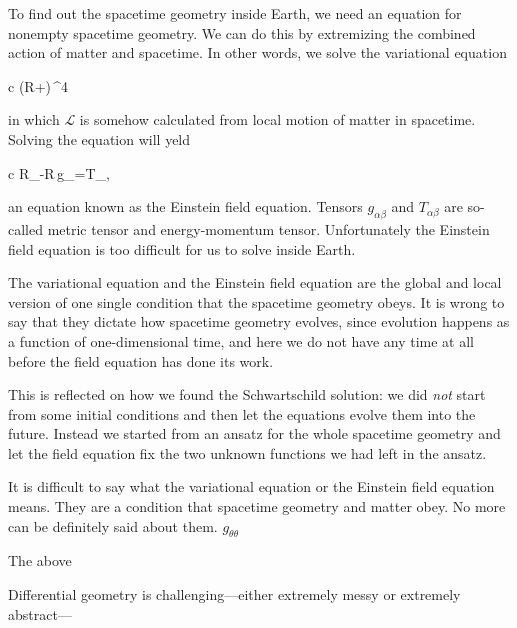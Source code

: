 \documentclass[11pt,oneside%
]{memoir}
\newenvironment{eqna}{\begin{IEEEeqnarray*}{c}}{\end{IEEEeqnarray*}\ignorespacesafterend}
\newcommand{\dd}{\mathrm{d}}
\begin{document}
To find out the spacetime geometry inside Earth, we need an equation for nonempty spacetime geometry. We can do this by extremizing the combined action of matter and spacetime. In other words, we solve the variational equation
\begin{eqna}
\delta\int(R+)\,\dd^4
\end{eqna}
in which \(\mathcal{L}\) is somehow calculated from local motion of matter in spacetime. Solving the equation will yeld
\begin{eqna}
R_{\alpha\beta}-R\,g_{\alpha\beta}=T_{\alpha\beta},%
\end{eqna}
an equation known as the Einstein field equation. Tensors \(g_{\alpha\beta}\) and \(T_{\alpha\beta}\) are so-called metric tensor and energy-momentum tensor. Unfortunately the Einstein field equation is too difficult for us to solve inside Earth.


The variational equation and the Einstein field equation are the global and local version of one single condition that the spacetime geometry obeys. It is wrong to say that they dictate how spacetime geometry evolves, since evolution happens as a function of one-dimensional time, and here we do not have any time at all before the field equation has done its work.

This is reflected on how we found the Schwartschild solution: we did \emph{not} start from some initial conditions and then let the equations evolve them into the future. Instead we started from an ansatz for the whole spacetime geometry and let the field equation fix the two unknown functions we had left in the ansatz.

It is difficult to say what the variational equation or the Einstein field equation means. They are a condition that spacetime geometry and matter obey. No more can be definitely said about them.
\(g_{\theta\theta}\)


The above


Differential geometry is challenging---either extremely messy or extremely abstract---



\end{document}
